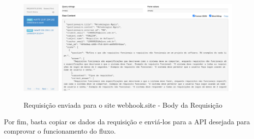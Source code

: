 \begin{figure}[H]
    \centering
    \caption{Requisição enviada para o site webhook.site - Body da Requisição}
    \includegraphics[width=1\textwidth]{figuras/webhook_2.png}
    \label{fig:report_questions}
\end{figure}

Por fim, basta copiar os dados da requisição e enviá-los para a API desejada para comprovar o funcionamento do fluxo.